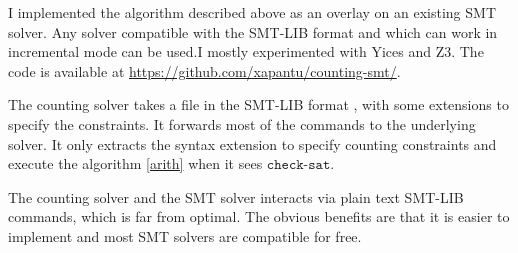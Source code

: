 I implemented the algorithm described above as an overlay on an existing SMT solver. Any solver
compatible with the SMT-LIB format \cite{barrett2010smt} and which can work in incremental mode can
be used.I mostly experimented with Yices and Z3. The code is available at
\url{https://github.com/xapantu/counting-smt/}.

The counting solver takes a file in the SMT-LIB format \cite{barrett2010smt}, with some extensions
to specify the constraints. It forwards most of the commands to the underlying solver. It only
extracts the syntax extension to specify counting constraints and execute the algorithm \ref{arith}
when it sees $\texttt{check-sat}$.

The counting solver and the SMT solver interacts via plain text SMT-LIB  commands, which is far from
optimal. The obvious benefits are that it is easier to implement and most SMT solvers are compatible
for free.

